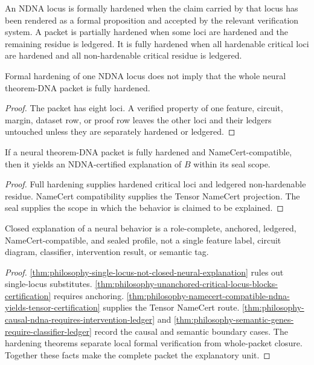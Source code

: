 \begin{definition}
\label{def:philosophy-ndna-hardening}
An NDNA locus is formally hardened when the claim carried by that locus
has been rendered as a formal proposition and accepted by the relevant
verification system. A packet is partially hardened when some loci are
hardened and the remaining residue is ledgered. It is fully hardened
when all hardenable critical loci are hardened and all non-hardenable
critical residue is ledgered.
\end{definition}

\begin{theorem}
\label{thm:philosophy-one-hardened-locus-not-whole-ndna}
Formal hardening of one NDNA locus does not imply that the whole neural
theorem-DNA packet is fully hardened.
\end{theorem}
\begin{proof}
The packet has eight loci. A verified property of one feature, circuit,
margin, dataset row, or proof row leaves the other loci and their
ledgers untouched unless they are separately hardened or ledgered.
\end{proof}

\begin{theorem}
\label{thm:philosophy-fully-hardened-compatible-ndna-certified}
If a neural theorem-DNA packet is fully hardened and
NameCert-compatible, then it yields an NDNA-certified explanation of
$B$ within its seal scope.
\end{theorem}
\begin{proof}
Full hardening supplies hardened critical loci and ledgered
non-hardenable residue. NameCert compatibility supplies the Tensor
NameCert projection. The seal supplies the scope in which the behavior
is claimed to be explained.
\end{proof}

\begin{theorem}
\label{thm:philosophy-neural-theorem-dna-theorem}
Closed explanation of a neural behavior is a role-complete, anchored,
ledgered, NameCert-compatible, and sealed profile, not a single feature
label, circuit diagram, classifier, intervention result, or semantic
tag.
\end{theorem}
\begin{proof}
\autoref{thm:philosophy-single-locus-not-closed-neural-explanation}
rules out single-locus substitutes.
\autoref{thm:philosophy-unanchored-critical-locus-blocks-certification}
requires anchoring.
\autoref{thm:philosophy-namecert-compatible-ndna-yields-tensor-certification}
supplies the Tensor NameCert route.
\autoref{thm:philosophy-causal-ndna-requires-intervention-ledger} and
\autoref{thm:philosophy-semantic-genes-require-classifier-ledger} record
the causal and semantic boundary cases. The hardening theorems separate
local formal verification from whole-packet closure. Together these
facts make the complete packet the explanatory unit.
\end{proof}

